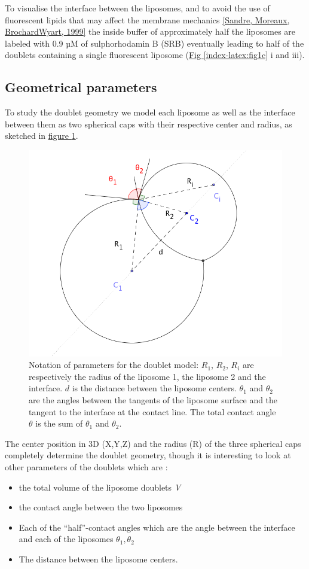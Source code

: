 \documentclass[A4paperpaper,11pt,english]{sphinxmanual}
\begin{document}
To visualise the interface between the liposomes, and to avoid the use of fluorescent
lipids that may affect the membrane mechanics {\hyperref[index-latex:sandre1999]{{[}Sandre, Moreaux, BrochardWyart,  1999{]}}} the inside
buffer of approximately half the liposomes are labeled with 0.9 µM
of sulphorhodamin B (SRB)
eventually leading to half of the doublets containing a single fluorescent liposome (\hyperref[index-latex:fig1c]{Fig  \ref*{index-latex:fig1c}} i and iii).


\subsection{Geometrical parameters}
\label{index-latex:geometrical-parameters}
To study the doublet geometry we model each liposome as well as the interface
between them as two spherical caps with their respective center and radius, as
sketched in \hyperref[index-latex:fig-notations-doublets]{figure  \ref*{index-latex:fig-notations-doublets}}.
\begin{figure}[htbp]
\centering
\capstart

\includegraphics[width=0.500\linewidth]{notations-doublets.png}
\caption{Notation of parameters for the doublet model: \(R_1\), \(R_2\), \(R_i\) are respectively the
radius of the liposome 1, the liposome 2 and the interface. \(d\) is the
distance between the liposome centers. \(\theta_1\) and \(\theta_2\) are the angles between
the tangents of the liposome surface and the tangent to the interface at the
contact line. The total contact angle \(\theta\) is the sum of \(\theta_1\) and \(\theta_2\).}\label{index-latex:fig-notations-doublets}\end{figure}

The center position in 3D (X,Y,Z) and the radius (R) of the three spherical caps
completely determine the doublet geometry, though it is interesting to look at other
parameters of the doublets which are :
\begin{itemize}
\item {} 
the total volume of the liposome doublets \emph{V}

\item {} 
the contact angle between the two liposomes

\item {} 
Each of the ``half''-contact angles which are the angle between the
interface and each of the liposomes \(\theta_1,\theta_2\)

\item {} 
The distance between the liposome centers.

\end{itemize}
\end{document}
